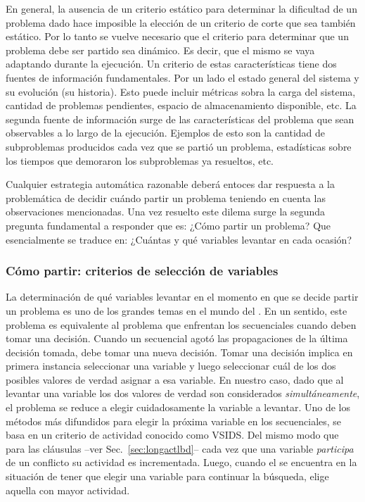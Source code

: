 En general, la ausencia de un criterio estático para determinar la dificultad
de un problema dado hace imposible la elección de un criterio de corte que
sea también estático. Por lo tanto se vuelve necesario que el criterio para
determinar que un problema debe ser partido sea dinámico. Es decir, que el
mismo se vaya adaptando durante la ejecución. Un criterio de estas
características tiene dos fuentes de información fundamentales. Por un lado el
estado general del sistema y su evolución (su historia). Esto puede incluir
métricas sobra la carga del sistema, cantidad de problemas pendientes, espacio
de almacenamiento disponible, etc. La segunda fuente de información surge de
las características del problema que sean observables a lo largo de la
ejecución. Ejemplos de esto son la cantidad de subproblemas producidos cada
vez que se partió un problema, estadísticas sobre los tiempos que demoraron
los subproblemas ya resueltos, etc. 

Cualquier estrategia automática razonable deberá entoces dar respuesta a la
problemática de decidir cuándo partir un problema teniendo en cuenta las
observaciones mencionadas. Una vez resuelto este dilema surge la segunda
pregunta fundamental a responder que es: ¿Cómo partir un problema? Que
esencialmente se traduce en: ¿Cuántas y qué variables levantar en cada ocasión?

\subsubsection{Cómo partir: criterios de selección de variables}

\newcommand{\vsids}{VSIDS\xspace}

La determinación de qué variables levantar en el momento en que se decide
partir un problema es uno de los grandes temas en el mundo del \ssolving. En
un sentido, este problema es equivalente al problema que enfrentan los
\ssolver secuenciales cuando deben tomar una decisión. Cuando un \ssolver
secuencial agotó las propagaciones de la última decisión tomada, debe tomar
una nueva decisión. Tomar una decisión implica en primera instancia
seleccionar una variable y luego seleccionar cuál de los dos posibles valores
de verdad asignar a esa variable. En nuestro caso, dado que al levantar una
variable los dos valores de verdad son considerados \emph{simultáneamente}, el
problema se reduce a elegir cuidadosamente la variable a levantar. Uno de los
métodos más difundidos para elegir la próxima variable en los \ssolvers
secuenciales, se basa en un criterio de actividad conocido como \vsids. Del
mismo modo que para las cláusulas --ver Sec.~\ref{sec:longactlbd}-- cada vez que
una variable \emph{participa} de un conflicto su actividad es incrementada.
Luego, cuando el \ssolver se encuentra en la situación de tener que elegir una
variable para continuar la búsqueda, elige aquella con mayor actividad.

